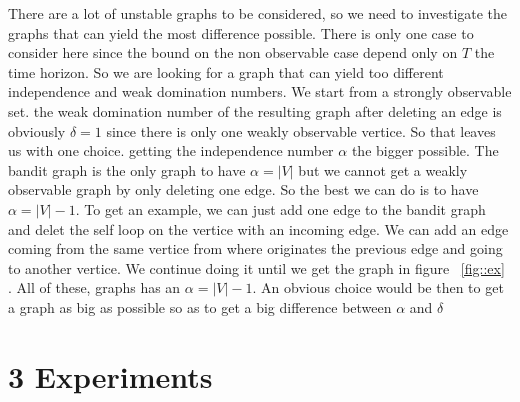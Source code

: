 \documentclass{article} %
\begin{document}
  There are a  lot of unstable graphs to be considered, so we need to investigate the graphs that can yield the most difference possible. There is only one case to consider here since the bound on the non observable case depend only on $T$ the time horizon. So we are looking for a graph that can yield too different independence and weak domination numbers. We start from a strongly observable set. the weak domination number of the resulting graph after deleting an edge is obviously $\delta=1$ since there is only one weakly observable vertice. So that leaves us with one choice. getting the independence number $\alpha$ the bigger possible. The bandit graph is the only graph to have $\alpha =\vert V\vert$ but we cannot get a weakly observable graph by only deleting one edge. So the best we can do is to have $\alpha=\vert V \vert -1$. To get an example, we can just add one edge to the bandit graph and delet the self loop on the vertice with an incoming edge. We can add an edge coming from the same vertice from where originates the previous edge and going to another vertice. We continue doing it until we get the graph in figure ~\ref{fig::ex} . All of these, graphs has an $\alpha= \vert V\vert -1$. An obvious choice would be then to get a graph as big as possible so as to get a big difference between $\alpha$ and $\delta$
~\\
\section*{3 Experiments }




\SetVertexNormal[Shape      = circle,
FillColor  = white,
LineWidth  = 2pt]
\SetUpEdge[lw         = 1.5pt,
color      = black,
labelcolor = white,
labeltext  = red,
labelstyle = {sloped,draw,text=blue}]
\end{document}
